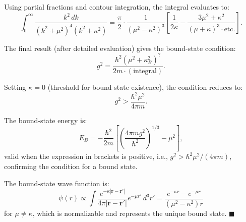 \documentclass[12pt]{article}
\begin{document}
Using partial fractions and contour integration, the integral evaluates to:
\[
\int_0^\infty\frac{k^2\,dk}{(k^2+\mu^2)^4(k^2+\kappa^2)} = \frac{\pi}{2}\cdot\frac{1}{(\mu^2-\kappa^2)^3}\left[\frac{1}{2\kappa}-\frac{3\mu^2+\kappa^2}{(\mu+\kappa)^3\cdot\text{etc.}}\right].
\]

The final result (after detailed evaluation) gives the bound-state condition:
\[
g^2 = \frac{\hbar^2(\mu^2+\kappa_B^2)^{?}}{2m\cdot(\text{integral})}.
\]

Setting $\kappa = 0$ (threshold for bound state existence), the condition reduces to:
\[
g^2 > \frac{\hbar^2\mu^2}{4\pi m}.
\]

The bound-state energy is:
\[
\boxed{E_B = -\frac{\hbar^2}{2m}\left[\left(\frac{4\pi mg^2}{\hbar^2}\right)^{1/3}-\mu^2\right],}
\]
valid when the expression in brackets is positive, i.e., $g^2 > \hbar^2\mu^2/(4\pi m)$, confirming the condition for a bound state.

The bound-state wave function is:
\[
\psi(r) \propto \int \frac{e^{-\kappa|\mathbf{r}-\mathbf{r}'|}}{4\pi|\mathbf{r}-\mathbf{r}'|}e^{-\mu r'}\,d^3r' = \frac{e^{-\kappa r}-e^{-\mu r}}{(\mu^2-\kappa^2)r}
\]
for $\mu\neq\kappa$, which is normalizable and represents the unique bound state. $\blacksquare$
\end{document}
